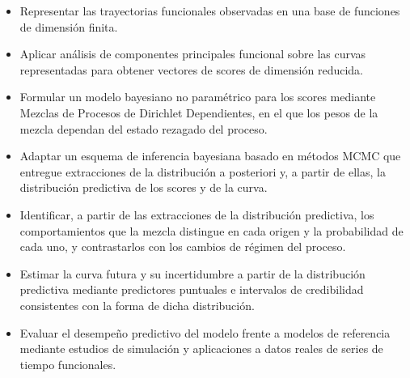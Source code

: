 \begin{itemize}
    \item Representar las trayectorias funcionales observadas en una base de funciones de dimensión finita.

    \item Aplicar análisis de componentes principales funcional sobre las curvas representadas para obtener vectores de scores de dimensión reducida.

    \item Formular un modelo bayesiano no paramétrico para los scores mediante Mezclas de Procesos de Dirichlet Dependientes, en el que los pesos de la mezcla dependan del estado rezagado del proceso.

    \item Adaptar un esquema de inferencia bayesiana basado en métodos MCMC que entregue extracciones de la distribución a posteriori y, a partir de ellas, la distribución predictiva de los scores y de la curva.

    \item Identificar, a partir de las extracciones de la distribución predictiva, los comportamientos que la mezcla distingue en cada origen y la probabilidad de cada uno, y contrastarlos con los cambios de régimen del proceso.

    \item Estimar la curva futura y su incertidumbre a partir de la distribución predictiva mediante predictores puntuales e intervalos de credibilidad consistentes con la forma de dicha distribución.

    \item Evaluar el desempeño predictivo del modelo frente a modelos de referencia mediante estudios de simulación y aplicaciones a datos reales de series de tiempo funcionales.
\end{itemize}